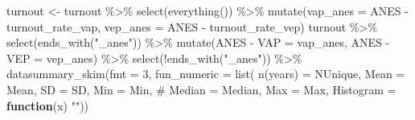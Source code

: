 \documentclass[
  letterpaper,
  DIV=11,
  numbers=noendperiod]{scrartcl}
\newenvironment{Shaded}{\begin{snugshade}}{\end{snugshade}}
\newcommand{\AttributeTok}[1]{\textcolor[rgb]{0.40,0.45,0.13}{#1}}
\newcommand{\CommentTok}[1]{\textcolor[rgb]{0.37,0.37,0.37}{#1}}
\newcommand{\ControlFlowTok}[1]{\textcolor[rgb]{0.00,0.23,0.31}{\textbf{#1}}}
\newcommand{\DecValTok}[1]{\textcolor[rgb]{0.68,0.00,0.00}{#1}}
\newcommand{\FunctionTok}[1]{\textcolor[rgb]{0.28,0.35,0.67}{#1}}
\newcommand{\NormalTok}[1]{\textcolor[rgb]{0.00,0.23,0.31}{#1}}
\newcommand{\OtherTok}[1]{\textcolor[rgb]{0.00,0.23,0.31}{#1}}
\newcommand{\SpecialCharTok}[1]{\textcolor[rgb]{0.37,0.37,0.37}{#1}}
\newcommand{\StringTok}[1]{\textcolor[rgb]{0.13,0.47,0.30}{#1}}
\begin{document}
\begin{Shaded}
\begin{Highlighting}[]
\NormalTok{turnout }\OtherTok{\textless{}{-}}\NormalTok{ turnout }\SpecialCharTok{\%\textgreater{}\%} 
  \FunctionTok{select}\NormalTok{(}\FunctionTok{everything}\NormalTok{()) }\SpecialCharTok{\%\textgreater{}\%} 
  \FunctionTok{mutate}\NormalTok{(}\AttributeTok{vap\_anes =}\NormalTok{ ANES }\SpecialCharTok{{-}}\NormalTok{ turnout\_rate\_vap,}
         \AttributeTok{vep\_anes =}\NormalTok{ ANES }\SpecialCharTok{{-}}\NormalTok{ turnout\_rate\_vep)}
\NormalTok{turnout }\SpecialCharTok{\%\textgreater{}\%} 
  \FunctionTok{select}\NormalTok{(}\FunctionTok{ends\_with}\NormalTok{(}\StringTok{"\_anes"}\NormalTok{)) }\SpecialCharTok{\%\textgreater{}\%} 
  \FunctionTok{mutate}\NormalTok{(}\StringTok{\textquotesingle{}ANES {-} VAP\textquotesingle{}} \OtherTok{=}\NormalTok{ vap\_anes,}
         \StringTok{\textquotesingle{}ANES {-} VEP\textquotesingle{}} \OtherTok{=}\NormalTok{ vep\_anes) }\SpecialCharTok{\%\textgreater{}\%} 
  \FunctionTok{select}\NormalTok{(}\SpecialCharTok{!}\FunctionTok{ends\_with}\NormalTok{(}\StringTok{"\_anes"}\NormalTok{)) }\SpecialCharTok{\%\textgreater{}\%} 
  \FunctionTok{datasummary\_skim}\NormalTok{(}\AttributeTok{fmt =} \DecValTok{3}\NormalTok{,}
                   \AttributeTok{fun\_numeric =} \FunctionTok{list}\NormalTok{(}
                     \StringTok{\textquotesingle{}n(years)\textquotesingle{}} \OtherTok{=}\NormalTok{ NUnique,}
                     \AttributeTok{Mean =}\NormalTok{ Mean,}
                     \AttributeTok{SD =}\NormalTok{ SD,}
                     \AttributeTok{Min =}\NormalTok{ Min,}
                     \CommentTok{\# Median = Median,}
                     \AttributeTok{Max =}\NormalTok{ Max,}
                     \AttributeTok{Histogram =} \ControlFlowTok{function}\NormalTok{(x) }\StringTok{""}\NormalTok{))}
\end{Highlighting}
\end{Shaded}
\end{document}
